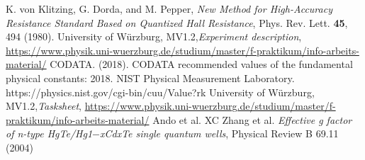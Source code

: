 \begin{thebibliography}{99}
     K. von Klitzing, G. Dorda, and M. Pepper, \emph{New Method for High-Accuracy
    Resistance Standard Based on Quantized Hall Resistance}, Phys. Rev. Lett. \textbf{45}, 494 (1980).
     University of Würzburg, MV1.2,\emph{Experiment description}, \url{https://www.physik.uni-wuerzburg.de/studium/master/f-praktikum/info-arbeits-material/}
    CODATA. (2018). CODATA recommended values of the fundamental physical constants: 
    2018. NIST Physical Measurement Laboratory.
    https://physics.nist.gov/cgi-bin/cuu/Value?rk
     University of Würzburg, MV1.2,\emph{Tasksheet}, \url{https://www.physik.uni-wuerzburg.de/studium/master/f-praktikum/info-arbeits-material/}
     Ando et al.
     XC Zhang et al. \emph{Effective g factor of n-type HgTe/Hg1$−$xCdxTe single quantum wells}, 
                    Physical Review B 69.11 (2004)

\end{thebibliography}



